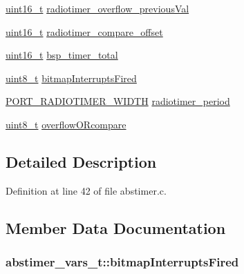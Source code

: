 \begin{DoxyCompactItemize}
\hyperlink{_p_e___types_8h_a1f1825b69244eb3ad2c7165ddc99c956}{uint16\+\_\+t} \hyperlink{structabstimer__vars__t_a2f1bc141ad08276cd8fde19c2e2f301d}{radiotimer\+\_\+overflow\+\_\+previous\+Val}
\item 
\hyperlink{_p_e___types_8h_a1f1825b69244eb3ad2c7165ddc99c956}{uint16\+\_\+t} \hyperlink{structabstimer__vars__t_a563f76da43061c7122674e6d9c400566}{radiotimer\+\_\+compare\+\_\+offset}
\item 
\hyperlink{_p_e___types_8h_a1f1825b69244eb3ad2c7165ddc99c956}{uint16\+\_\+t} \hyperlink{structabstimer__vars__t_a31e2373c7888f99ea2de849700b6da02}{bsp\+\_\+timer\+\_\+total}
\item 
\hyperlink{_p_e___types_8h_aba7bc1797add20fe3efdf37ced1182c5}{uint8\+\_\+t} \hyperlink{structabstimer__vars__t_a1ec85f57e3537452d4e639cd83c8c32e}{bitmap\+Interrupts\+Fired}
\item 
\hyperlink{z1_2board__info_8h_ac16e02aadd749b2d27638bed1a805a59}{P\+O\+R\+T\+\_\+\+R\+A\+D\+I\+O\+T\+I\+M\+E\+R\+\_\+\+W\+I\+D\+TH} \hyperlink{structabstimer__vars__t_aa30a1e953941c83d96cee6e06dc49748}{radiotimer\+\_\+period}
\item 
\hyperlink{_p_e___types_8h_aba7bc1797add20fe3efdf37ced1182c5}{uint8\+\_\+t} \hyperlink{structabstimer__vars__t_a84d82332ec6c22add31f5f5a920df8ad}{overflow\+O\+Rcompare}
\end{DoxyCompactItemize}


\subsection{Detailed Description}


Definition at line 42 of file abstimer.\+c.



\subsection{Member Data Documentation}
\subsubsection[{\texorpdfstring{bitmap\+Interrupts\+Fired}{bitmapInterruptsFired}}]{ abstimer\+\_\+vars\+\_\+t\+::bitmap\+Interrupts\+Fired}\hypertarget{structabstimer__vars__t_a1ec85f57e3537452d4e639cd83c8c32e}{}\label{structabstimer__vars__t_a1ec85f57e3537452d4e639cd83c8c32e}


